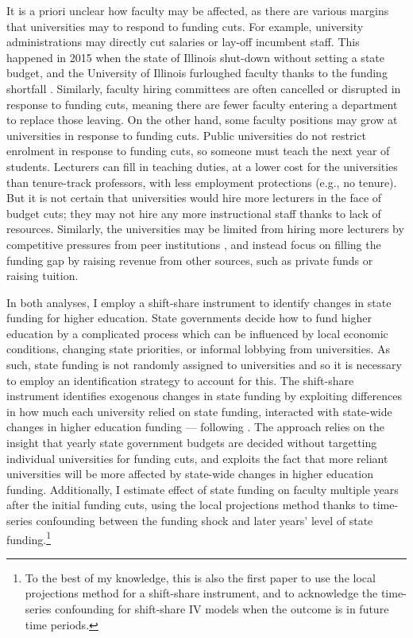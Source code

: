 It is a priori unclear how faculty may be affected, as there are various margins that universities may to respond to funding cuts.
For example, university administrations may directly cut salaries or lay-off incumbent staff.
This happened in 2015 when the state of Illinois shut-down without setting a state budget, and the University of Illinois furloughed faculty thanks to the funding shortfall \citep{furlough2010}.
Similarly, faculty hiring committees are often cancelled or disrupted in response to funding cuts, meaning there are fewer faculty entering a department to replace those leaving.
On the other hand, some faculty positions may grow at universities in response to funding cuts.
Public universities do not restrict enrolment in response to funding cuts, so someone must teach the next year of students.
Lecturers can fill in teaching duties, at a lower cost for the universities than tenure-track professors, with less employment protections (e.g., no tenure).
But it is not certain that universities would hire more lecturers in the face of budget cuts; they may not hire any more instructional staff thanks to lack of resources.
Similarly, the universities may be limited from hiring more lecturers by competitive pressures from peer institutions \citep{hoxby2009changing,urquiola2020markets}, and instead focus on filling the funding gap by raising revenue from other sources, such as private funds or raising tuition.

In both analyses, I employ a shift-share instrument to identify changes in state funding for higher education.
State governments decide how to fund higher education by a complicated process which can be influenced by local economic conditions, changing state priorities, or informal lobbying from universities.
As such, state funding is not randomly assigned to universities and so it is necessary to employ an identification strategy to account for this.
The shift-share instrument identifies exogenous changes in state funding by exploiting differences in how much each university relied on state funding, interacted with state-wide changes in higher education funding --- following \cite{NBERw23736,NBERw27885}.
The approach relies on the insight that yearly state government budgets are decided without targetting individual universities for funding cuts, and exploits the fact that more reliant universities will be more affected by state-wide changes in higher education funding.
Additionally, I estimate effect of state funding on faculty multiple years after the initial funding cuts, using the local projections method thanks to time-series confounding between the funding shock and later years' level of state funding.\footnote{
    To the best of my knowledge, this is also the first paper to use the local projections method for a shift-share instrument, and to acknowledge the time-series confounding for shift-share IV models when the outcome is in future time periods.
}

